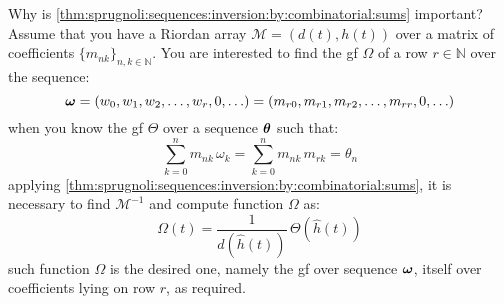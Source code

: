 Why is \autoref{thm:sprugnoli:sequences:inversion:by:combinatorial:sums} important?
Assume that you have a Riordan array $\mathcal{M}=(d(t),h(t))$ over a matrix of coefficients
$\lbrace m_{nk}\rbrace_{n,k\in\mathbb{N}}$. You are interested to find the
\ac{gf} $\Omega$ of a row $r\in\mathbb{N}$ over the sequence:
\begin{displaymath}
    \boldsymbol{\omega} 
        =(w_{0},w_{1},w_{2},\ldots,w_{r},0,\ldots)
        =(m_{r0},m_{r1},m_{r2},\ldots,m_{rr},0,\ldots)
\end{displaymath}
when you know the \ac{gf} $\Theta$ over a sequence $\boldsymbol{\theta}$ such that:
\begin{displaymath}
    \sum_{k=0}^{n}{m_{nk}\,\omega_{k}}
        =\sum_{k=0}^{n}{m_{nk}\,m_{rk}}
        =\theta_{n}
\end{displaymath}
applying \autoref{thm:sprugnoli:sequences:inversion:by:combinatorial:sums},
it is necessary to find $\mathcal{M}^{-1}$ and compute function $\Omega$ as:
\begin{displaymath}
    \Omega(t)=\frac{1}{d(\hat{h}(t))}\,\Theta(\hat{h}(t))
\end{displaymath}
such function $\Omega$ is the desired one, namely the \ac{gf} over
sequence $\boldsymbol{\omega}$, itself over coefficients lying on row $r$, as required.

